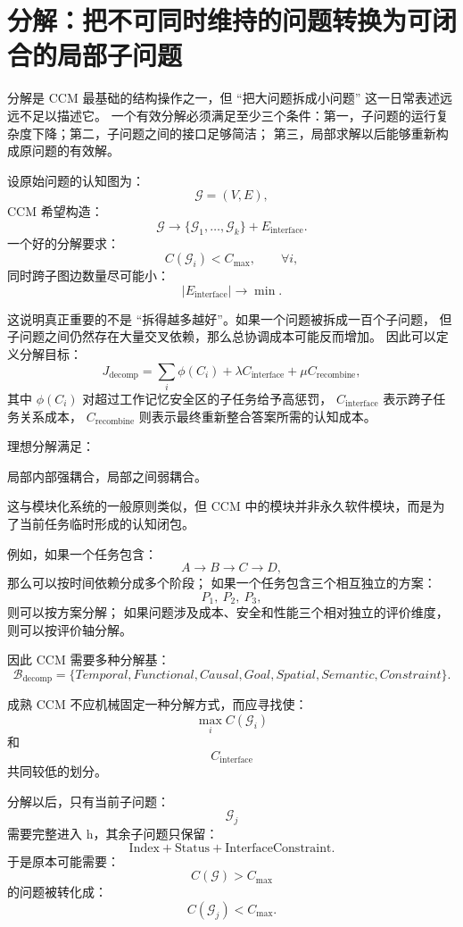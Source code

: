 \section{分解：把不可同时维持的问题转换为可闭合的局部子问题}

分解是 CCM 最基础的结构操作之一，但 ``把大问题拆成小问题'' 这一日常表述远远不足以描述它。
一个有效分解必须满足至少三个条件：第一，子问题的运行复杂度下降；第二，子问题之间的接口足够简洁；
第三，局部求解以后能够重新构成原问题的有效解。

设原始问题的认知图为：
\[
\mathcal G
=
(V,E),
\]
CCM 希望构造：
\[
\mathcal G
\longrightarrow
\{\mathcal G_1,\ldots,\mathcal G_k\}
+
E_{\mathrm{interface}}.
\]
一个好的分解要求：
\[
C(\mathcal G_i)
<
C_{\max},
\qquad
\forall i,
\]
同时跨子图边数量尽可能小：
\[
|E_{\mathrm{interface}}|
\rightarrow
\min.
\]

这说明真正重要的不是 ``拆得越多越好''。如果一个问题被拆成一百个子问题，
但子问题之间仍然存在大量交叉依赖，那么总协调成本可能反而增加。
因此可以定义分解目标：
\[
J_{\mathrm{decomp}}
=
\sum_i
\phi(C_i)
+
\lambda
C_{\mathrm{interface}}
+
\mu
C_{\mathrm{recombine}},
\]
其中 $\phi(C_i)$ 对超过工作记忆安全区的子任务给予高惩罚，
$C_{\mathrm{interface}}$ 表示跨子任务关系成本，
$C_{\mathrm{recombine}}$ 则表示最终重新整合答案所需的认知成本。

理想分解满足：
\begin{statementbox}
局部内部强耦合，局部之间弱耦合。
\end{statementbox}
这与模块化系统的一般原则类似，但 CCM 中的模块并非永久软件模块，而是为了当前任务临时形成的认知闭包。

例如，如果一个任务包含：
\[
A\rightarrow B\rightarrow C\rightarrow D,
\]
那么可以按时间依赖分成多个阶段；
如果一个任务包含三个相互独立的方案：
\[
P_1,\ P_2,\ P_3,
\]
则可以按方案分解；
如果问题涉及成本、安全和性能三个相对独立的评价维度，
则可以按评价轴分解。

因此 CCM 需要多种分解基：
\[
\mathcal B_{\mathrm{decomp}}
=
\{
Temporal,
Functional,
Causal,
Goal,
Spatial,
Semantic,
Constraint
\}.
\]

成熟 CCM 不应机械固定一种分解方式，而应寻找使：
\[
\max_i C(\mathcal G_i)
\]
和
\[
C_{\mathrm{interface}}
\]
共同较低的划分。

分解以后，只有当前子问题：
\[
\mathcal G_j
\]
需要完整进入 h，其余子问题只保留：
\[
\mathrm{Index}
+
\mathrm{Status}
+
\mathrm{InterfaceConstraint}.
\]
于是原本可能需要：
\[
C(\mathcal G)>C_{\max}
\]
的问题被转化成：
\[
C(\mathcal G_j)<C_{\max}.
\]

